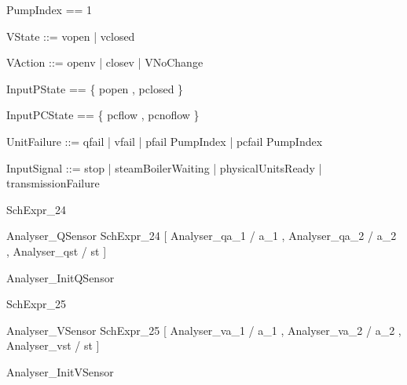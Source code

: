\documentclass{article}
\begin{document}
\begin{zed}
	PumpIndex == 1 
\end{zed}

\begin{zed}
	VState ::= vopen | vclosed
\end{zed}

\begin{zed}
	VAction ::= openv | closev | VNoChange
\end{zed}

\begin{zed}
	InputPState == \{ popen , pclosed \}
\end{zed}

\begin{zed}
	InputPCState == \{ pcflow , pcnoflow \}
\end{zed}

\begin{zed}
	UnitFailure ::= qfail | vfail | pfail \ldata PumpIndex \rdata | pcfail \ldata PumpIndex \rdata
\end{zed}

\begin{zed}
	InputSignal ::= stop | steamBoilerWaiting | physicalUnitsReady | transmissionFailure
\end{zed}

\begin{zed}
	SchExpr\_24 
\end{zed}

\begin{zed}
	Analyser\_QSensor  SchExpr\_24 [ Analyser\_qa\_1 / a\_1 , Analyser\_qa\_2 / a\_2 , Analyser\_qst / st ]
\end{zed}

\begin{zed}
	Analyser\_InitQSensor 
\end{zed}

\begin{zed}
	SchExpr\_25 
\end{zed}

\begin{zed}
	Analyser\_VSensor  SchExpr\_25 [ Analyser\_va\_1 / a\_1 , Analyser\_va\_2 / a\_2 , Analyser\_vst / st ]
\end{zed}

\begin{zed}
	Analyser\_InitVSensor 
\end{zed}
\end{document}
